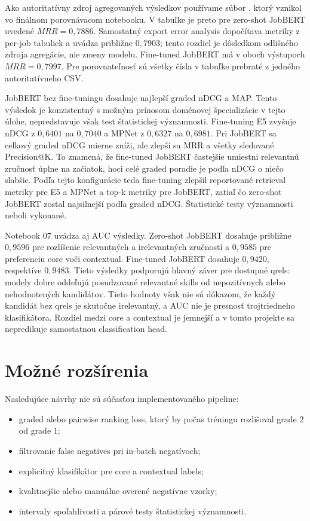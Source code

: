 \documentclass[12pt,a4paper]{article}
\newcommand{\code}[1]{\texttt{\detokenize{#1}}}
\begin{document}
Ako autoritatívny zdroj agregovaných výsledkov používame súbor
\code{results/final_system_comparison.csv}, ktorý vznikol vo finálnom
porovnávacom notebooku. V tabuľke je preto pre zero-shot JobBERT uvedené
\(MRR=0{,}7886\). Samostatný export error analysis dopočítava metriky z
per-job tabuliek a uvádza približne \(0{,}7903\); tento rozdiel je dôsledkom
odlišného zdroja agregácie, nie zmeny modelu. Fine-tuned JobBERT má v oboch
výstupoch \(MRR=0{,}7997\). Pre porovnateľnosť sú všetky čísla v tabuľke
prebraté z jedného autoritatívneho CSV.

JobBERT bez fine-tuningu dosahuje najlepší graded nDCG a MAP. Tento výsledok
je konzistentný s možným prínosom doménovej špecializácie v tejto úlohe,
nepredstavuje však test štatistickej významnosti. Fine-tuning E5 zvyšuje
nDCG z \(0{,}6401\)
na \(0{,}7040\) a MPNet z \(0{,}6327\) na \(0{,}6981\). Pri JobBERT sa
celkový graded nDCG mierne zníži, ale zlepší sa MRR a všetky sledované
Precision@K. To znamená, že fine-tuned JobBERT častejšie umiestni relevantnú
zručnosť úplne na začiatok, hoci celé graded poradie je podľa nDCG o niečo
slabšie. Podľa tejto konfigurácie teda fine-tuning zlepšil reportované
retrieval metriky pre E5 a MPNet a top-k metriky pre JobBERT, zatiaľ čo
zero-shot JobBERT zostal najsilnejší podľa graded nDCG. Štatistické testy
významnosti neboli vykonané.

Notebook 07 uvádza aj AUC výsledky. Zero-shot JobBERT dosahuje približne
\(0{,}9596\) pre rozlíšenie relevantných a irelevantných zručností a
\(0{,}9585\) pre preferenciu core voči contextual. Fine-tuned JobBERT
dosahuje \(0{,}9420\), respektíve \(0{,}9483\). Tieto výsledky podporujú
hlavný záver pre dostupné qrels: modely dobre oddeľujú posudzované relevantné
skills od nepozitívnych alebo nehodnotených kandidátov. Tieto hodnoty však
nie sú dôkazom, že každý kandidát bez qrels je skutočne irelevantný, a AUC
nie je presnosť trojtriedneho klasifikátora. Rozdiel medzi core a contextual
je jemnejší a v tomto projekte sa nepredikuje samostatnou classification head.

\section{Možné rozšírenia}

Nasledujúce návrhy nie sú súčasťou implementovaného pipeline:
\begin{itemize}
  \item graded alebo pairwise ranking loss, ktorý by počas tréningu
  rozlišoval grade \(2\) od grade \(1\);
  \item filtrovanie false negatives pri in-batch negatívoch;
  \item explicitný klasifikátor pre core a contextual labels;
  \item kvalitnejšie alebo manuálne overené negatívne vzorky;
  \item intervaly spoľahlivosti a párové testy štatistickej významnosti.
\end{itemize}
\end{document}
